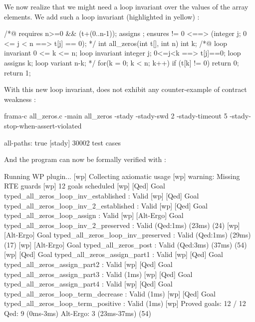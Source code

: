 \documentclass[web]{frama-c-book}
\begin{document}
We now realize that we might need a loop invariant over the values of the array elements. We add such a loop invariant (highlighted in yellow) :

\begin{ccode}
/*@ requires n>=0 && \valid(t+(0..n-1));
    assigns \nothing;
    ensures \result != 0 <==> 
      (\forall integer j; 0 <= j < n ==> t[j] == 0);
*/
int all_zeros(int t[], int n) {
  int k;
  /*@ loop invariant 0 <= k <= n;
      loop invariant \forall integer j; 0<=j<k ==> t[j]==0;
      loop assigns k;
      loop variant n-k; 
  */
  for(k = 0; k < n; k++) 
    if (t[k] != 0) 
      return 0;
  return 1;
}
\end{ccode}

With this new loop invariant, \stady does not exhibit any counter-example of contract weakness :

\begin{shell}
  frama-c all_zeros.c -main all_zeros -stady -stady-swd 2 -stady-timeout 5
  -stady-stop-when-assert-violated
\end{shell}

\begin{shell}
[stady] all-paths: true
[stady] 30002 test cases
\end{shell}

And the program can now be formally verified with  :

\begin{shell}
[wp] Running WP plugin...
[wp] Collecting axiomatic usage
[wp] warning: Missing RTE guards
[wp] 12 goals scheduled
[wp] [Qed] Goal typed_all_zeros_loop_inv_established : Valid
[wp] [Qed] Goal typed_all_zeros_loop_inv_2_established : Valid
[wp] [Qed] Goal typed_all_zeros_loop_assign : Valid
[wp] [Alt-Ergo] Goal typed_all_zeros_loop_inv_2_preserved : Valid (Qed:1ms) (23ms) (24)
[wp] [Alt-Ergo] Goal typed_all_zeros_loop_inv_preserved : Valid (Qed:1ms) (29ms) (17)
[wp] [Alt-Ergo] Goal typed_all_zeros_post : Valid (Qed:3ms) (37ms) (54)
[wp] [Qed] Goal typed_all_zeros_assign_part1 : Valid
[wp] [Qed] Goal typed_all_zeros_assign_part2 : Valid
[wp] [Qed] Goal typed_all_zeros_assign_part3 : Valid (1ms)
[wp] [Qed] Goal typed_all_zeros_assign_part4 : Valid
[wp] [Qed] Goal typed_all_zeros_loop_term_decrease : Valid (1ms)
[wp] [Qed] Goal typed_all_zeros_loop_term_positive : Valid (1ms)
[wp] Proved goals:   12 / 12
     Qed:             9  (0ms-3ms)
     Alt-Ergo:        3  (23ms-37ms) (54)
\end{shell}


\end{document}
